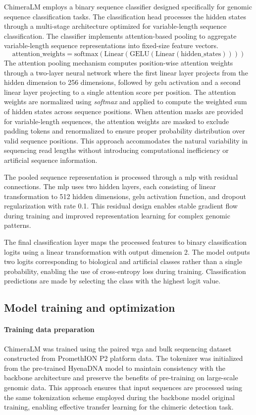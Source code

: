 \documentclass[pdflatex,sn-nature]{sn-jnl}%
\theoremstyle{thmstyleone}%
\theoremstyle{thmstyletwo}%
\theoremstyle{thmstylethree}%
\begin{document}
ChimeraLM employs a binary sequence classifier designed specifically for genomic sequence classification tasks.
The classification head processes the hidden states through a multi-stage architecture optimized for variable-length sequence classification.
The classifier implements attention-based pooling to aggregate variable-length sequence representations into fixed-size feature vectors.
$$
	\textrm{attention\_weights} = \textrm{softmax}(\textrm{Linear}(\textrm{GELU}(\textrm{Linear}(\textrm{hidden\_states}))))
$$
The attention pooling mechanism computes position-wise attention weights through a two-layer neural network where the first linear layer projects from the hidden dimension to 256 dimensions, followed by \gls{gelu} activation and a second linear layer projecting to a single attention score per position.
The attention weights are normalized using \emph{softmax} and applied to compute the weighted sum of hidden states across sequence positions.
When attention masks are provided for variable-length sequences, the attention weights are masked to exclude padding tokens and renormalized to ensure proper probability distribution over valid sequence positions.
This approach accommodates the natural variability in sequencing read lengths without introducing computational inefficiency or artificial sequence information.

The pooled sequence representation is processed through a \gls{mlp} with residual connections.
The \gls{mlp} uses two hidden layers, each consisting of linear transformation to 512 hidden dimensions, \gls{gelu} activation function, and dropout regularization with rate 0.1.
This residual design enables stable gradient flow during training and improved representation learning for complex genomic patterns.

The final classification layer maps the processed features to binary classification logits using a linear transformation with output dimension 2.
The model outputs two logits corresponding to biological and artificial classes rather than a single probability, enabling the use of cross-entropy loss during training.
Classification predictions are made by selecting the class with the highest logit value.

\subsection*{Model training and optimization}

\paragraph{Training data preparation}
ChimeraLM was trained using the paired \gls{wga} and bulk sequencing dataset constructed from PromethION P2 platform data.
The tokenizer was initialized from the pre-trained HyenaDNA model to maintain consistency with the backbone architecture and preserve the benefits of pre-training on large-scale genomic data.
This approach ensures that input sequences are processed using the same tokenization scheme employed during the backbone model original training, enabling effective transfer learning for the chimeric detection task.
\end{document}
